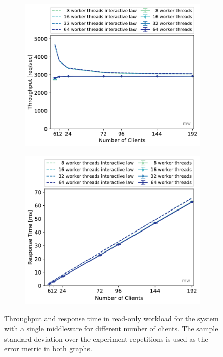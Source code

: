 \documentclass[11pt,a4paper]{article}
\begin{document}
\begin{figure}
	\begin{subfigure}[b]{.499\linewidth}
		\centering
		\includegraphics[width=\linewidth]{data/exp31_ro_tp_nc_w.pdf}
	\end{subfigure}\hfill
	\begin{subfigure}[b]{.499\linewidth}
		\centering
		\includegraphics[width=\linewidth]{data/exp31_ro_rt_nc_w.pdf}
	\end{subfigure}%
	\caption{Throughput and response time in read-only workload for the system with a single middleware for different number of clients. The sample standard deviation over the experiment repetitions is used as the error metric in both graphs.}\label{exp31_ro_tp_nc}
\end{figure}
\end{document}
